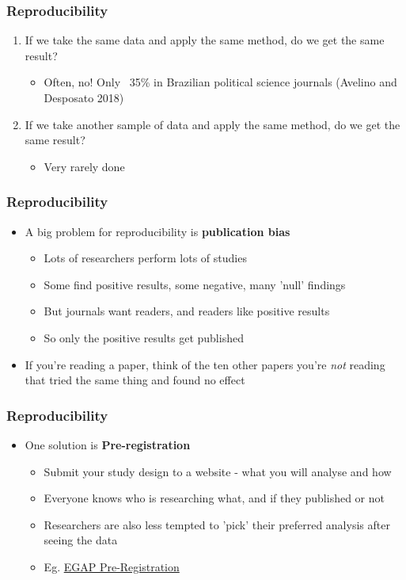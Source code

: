 \documentclass[xcolor=x11names,compress]{beamer}\usepackage[]{graphicx}\usepackage[]{color}
\renewcommand{\(}{\begin{columns}}
\renewcommand{\)}{\end{columns}}
\newcommand{\<}[1]{\begin{column}{#1}}
\renewcommand{\>}{\end{column}}
\begin{document}

\begin{frame}
\frametitle{Reproducibility}
\begin{enumerate}
\item If we take the same data and apply the same method, do we get the same result?
\begin{itemize}
\item Often, no! Only ~35\% in Brazilian political science journals (Avelino and Desposato 2018)
\end{itemize}
\item If we take another sample of data and apply the same method, do we get the same result?
\begin{itemize}
\item Very rarely done
\end{itemize}
\end{enumerate}
\end{frame}

\begin{frame}
\frametitle{Reproducibility}
\begin{itemize}
\item A big problem for reproducibility is \textbf{publication bias}
\begin{itemize}
\item Lots of researchers perform lots of studies
\item Some find positive results, some negative, many 'null' findings
\item But journals want readers, and readers like positive results
\item So only the positive results get published
\end{itemize}
\item If you're reading a paper, think of the ten other papers you're \textit{not} reading that tried the same thing and found no effect
\end{itemize}
\end{frame}

\begin{frame}
\frametitle{Reproducibility}
\begin{itemize}
\item One solution is \textbf{Pre-registration}
\begin{itemize}
\item Submit your study design to a website - what you will analyse and how
\item Everyone knows who is researching what, and if they published or not
\item Researchers are also less tempted to 'pick' their preferred analysis after seeing the data
\item Eg. \href{https://egap.org/content/registration}{EGAP Pre-Registration}
\end{itemize}
\end{itemize}
\end{frame}
\end{document}
